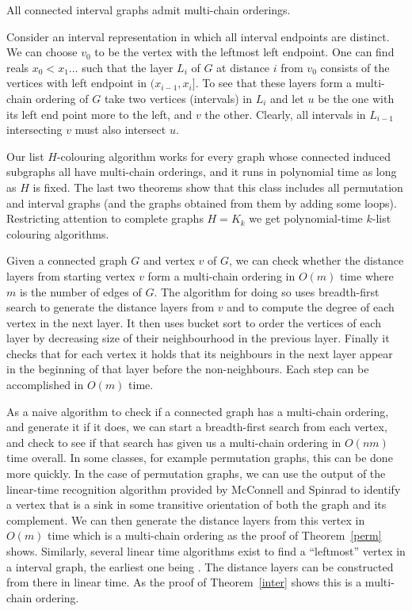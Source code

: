 \documentclass[12pt]{llncs}
\begin{document}
\begin{theorem}\label{inter}
All connected interval graphs admit multi-chain orderings.
\end{theorem}

\begin{my_proof}
Consider an interval representation in which all interval endpoints are distinct.
We can choose $v_0$ to be the vertex with the leftmost left endpoint.
One can find reals $x_0<x_1\ldots$ such that the layer $L_i$ of $G$ at
distance $i$ from $v_0$ consists of the vertices with left endpoint
in $(x_{i-1},x_i]$. To see that these layers form  a multi-chain
ordering of $G$ take two vertices (intervals) in $L_i$ and let $u$ be the one with
its left end point more to the left, and $v$ the other. Clearly, all
intervals in $L_{i-1}$ intersecting $v$ must also intersect $u$.
\end{my_proof}

Our list $H$-colouring algorithm works for every graph whose
connected induced subgraphs all have multi-chain orderings, and it runs in
polynomial time as long as $H$ is fixed. The last two theorems show that
this class includes all permutation and interval graphs (and the graphs
obtained from them by adding some loops). Restricting attention to complete
graphs $H=K_k$ we get polynomial-time $k$-list colouring algorithms. 


Given a connected graph $G$ and vertex $v$ of $G$,
we can check whether the distance layers from starting vertex $v$
form a multi-chain ordering in $O(m)$ time where $m$ is the number of edges
of $G$.
The algorithm for doing so uses breadth-first search to
generate the distance layers from $v$ and to compute the degree
of each vertex in the next layer.
It then uses bucket sort to order the vertices of each layer
by decreasing size of their neighbourhood in the previous layer.  
Finally it checks that for each vertex it holds that its neighbours in the
next layer appear in the beginning of that layer before the
non-neighbours. Each step can be accomplished in $O(m)$ time. 

 As a naive algorithm to check if a connected graph has a multi-chain ordering,
 and generate it if it does, we can start a breadth-first search from
 each vertex, and check to see if that search has given us a
 multi-chain ordering in $O(nm)$ time overall.  In some classes,
 for example permutation graphs, this can be done more quickly.  In
 the case of permutation graphs, we can use the output of the linear-time
 recognition algorithm provided by McConnell and Spinrad
 \cite{mcconnell} to  identify a vertex that is a sink in some
 transitive orientation of both the graph and its complement. We can
 then generate the distance layers from this vertex in $O(m)$ time which is
 a multi-chain ordering as the proof of Theorem~\ref{perm} shows. Similarly,
several linear time algorithms exist to find a ``leftmost'' vertex in a interval
 graph, the earliest one being \cite{BoL}. The distance layers can be constructed from there
 in linear time. As the proof of
 Theorem~\ref{inter} shows this is a multi-chain ordering.
\end{document}
